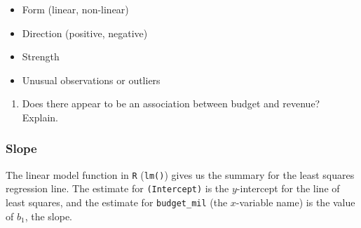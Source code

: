 \documentclass[
]{report}
\newenvironment{Shaded}{\begin{snugshade}}{\end{snugshade}}
\newcommand{\AttributeTok}[1]{\textcolor[rgb]{0.77,0.63,0.00}{#1}}
\newcommand{\CommentTok}[1]{\textcolor[rgb]{0.56,0.35,0.01}{\textit{#1}}}
\newcommand{\FunctionTok}[1]{\textcolor[rgb]{0.00,0.00,0.00}{#1}}
\newcommand{\NormalTok}[1]{#1}
\newcommand{\OtherTok}[1]{\textcolor[rgb]{0.56,0.35,0.01}{#1}}
\newcommand{\SpecialCharTok}[1]{\textcolor[rgb]{0.00,0.00,0.00}{#1}}
\providecommand{\tightlist}{%
  \setlength{\itemsep}{0pt}\setlength{\parskip}{0pt}}
\begin{document}
\begin{itemize}
\tightlist
\item
  Form (linear, non-linear)
\end{itemize}

\vspace{.2in}

\begin{itemize}
\tightlist
\item
  Direction (positive, negative)
\end{itemize}

\vspace{.2in}

\begin{itemize}
\tightlist
\item
  Strength
\end{itemize}

\vspace{.2in}

\begin{itemize}
\tightlist
\item
  Unusual observations or outliers
\end{itemize}

\vspace{.2in}

\begin{enumerate}
\def\labelenumi{\arabic{enumi}.}
\setcounter{enumi}{4}
\tightlist
\item
  Does there appear to be an association between budget and revenue? Explain.
\end{enumerate}

\vspace{1in}

\newpage

\hypertarget{slope}{%
\subsubsection*{Slope}\label{slope}}

The linear model function in \texttt{R} (\texttt{lm()}) gives us the summary for the least squares regression line. The estimate for \texttt{(Intercept)} is the \(y\)-intercept for the line of least squares, and the estimate for \texttt{budget\_mil} (the \(x\)-variable name) is the value of \(b_1\), the slope.

\begin{Shaded}
\end{Shaded}
\end{document}
